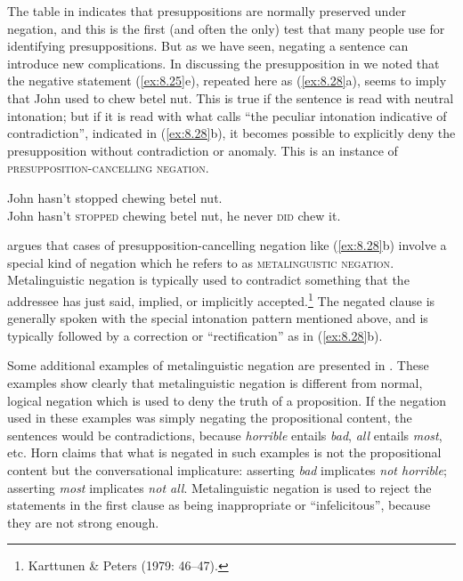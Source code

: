 The table in  indicates that presuppositions are normally preserved under negation, and this is the first (and often the only) test that many people use for identifying presuppositions. But as we have seen, negating a sentence can introduce new complications. In discussing the presupposition in  we noted that the negative statement (\ref{ex:8.25}e), repeated here as (\ref{ex:8.28}a), seems to imply that John used to chew betel nut. This is true if the sentence is read with neutral intonation; but if it is read with what \citet{Jespersen1933} calls “the peculiar intonation indicative of contradiction”, indicated in (\ref{ex:8.28}b), it becomes possible to explicitly deny the presupposition without contradiction or anomaly. This is an instance of \textsc{presupposition-cancelling negation}.


\begin{stylepoints} \label{ex:8.28}
\ea John hasn’t stopped chewing betel nut.\\
\ex John hasn’t \textsc{stopped} chewing betel nut, he never \textsc{did} chew it.
                       \z
\end{stylepoints}


\citet{Horn1985,Horn1989} argues that cases of presupposition-cancelling negation like (\ref{ex:8.28}b) involve a special kind of negation which he refers to as \textsc{metalinguistic} \textsc{negation}. Metalinguistic negation is typically used to contradict something that the addressee has just said, implied, or implicitly accepted.\footnote{Karttunen \& Peters (1979: 46–47).} The negated clause is generally spoken with the special intonation pattern mentioned above, and is typically followed by a correction or “rectification” as in (\ref{ex:8.28}b).



Some additional examples of metalinguistic negation are presented in . These examples show clearly that metalinguistic negation is different from normal, logical negation which is used to deny the truth of a proposition. If the negation used in these examples was simply negating the propositional content, the sentences would be contradictions, because \textit{horrible} entails \textit{bad}, \textit{all} entails \textit{most}, etc. Horn claims that what is negated in such examples is not the propositional content but the conversational implicature: asserting \textit{bad} implicates \textit{not horrible}; asserting \textit{most} implicates \textit{not all}. Metalinguistic negation is used to reject the statements in the first clause as being inappropriate or “infelicitous”, because they are not strong enough.


